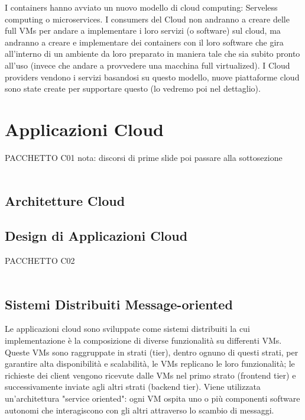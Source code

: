 \documentclass{article}
\begin{document}
I containers hanno avviato un nuovo modello di cloud computing: Serveless computing o microservices. I consumers del Cloud non andranno a creare delle full VMs per andare a implementare i loro servizi (o software) sul cloud, ma andranno a creare e implementare dei containers con il loro software che gira all'interno di un ambiente da loro preparato in maniera tale che sia subito pronto all'uso (invece che andare a provvedere una macchina full virtualized). I Cloud providers vendono i servizi basandosi su questo modello, nuove piattaforme cloud sono state create per supportare questo (lo vedremo poi nel dettaglio).

\newpage
\section{Applicazioni Cloud}
PACCHETTO C01
nota: discorsi di prime slide poi passare alla sottosezione\\ \\

\subsection{Architetture Cloud}


\subsection{Design di Applicazioni Cloud}
PACCHETTO C02\\ \\

\subsection{Sistemi Distribuiti Message-oriented}
Le applicazioni cloud sono sviluppate come sistemi distribuiti la cui implementazione è la composizione di diverse funzionalità su differenti VMs. Queste VMs sono raggruppate in strati (tier), dentro ognuno di questi strati, per garantire alta disponibilità e scalabilità, le VMs replicano le loro funzionalità; le richieste dei client vengono ricevute dalle VMs nel primo strato (frontend tier) e successivamente inviate agli altri strati (backend tier). 
Viene utilizzata un'architettura "service oriented": ogni VM ospita uno o più componenti software autonomi che interagiscono con gli altri attraverso lo scambio di messaggi.
\end{document}
